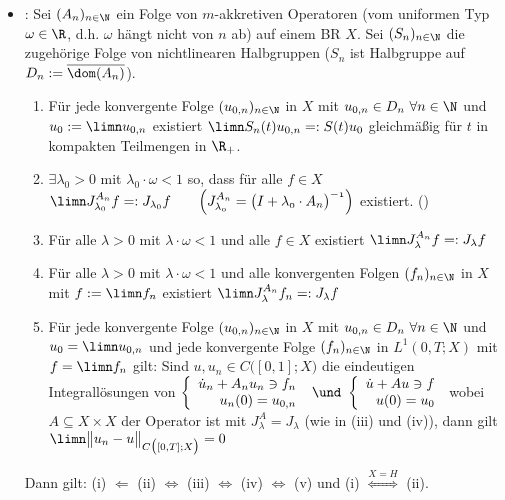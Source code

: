 	\begin{itemize}
		\item {}:
		Sei $(A_n)_{n\in\N}$ ein Folge von $m$-akkretiven Operatoren (vom uniformen Typ $\omega\in\R$, d.h. $\omega$ hängt nicht von $n$ ab) auf einem BR $X$.
	Sei $(S_n)_{n\in\N}$ die zugehörige Folge von nichtlinearen Halbgruppen ($S_n$ ist Halbgruppe auf $D_n:=\overline{\dom(A_n)}$). 
	\begin{enumerate}[label=(\roman*)]
		\item Für jede konvergente Folge $(u_{0,n})_{n\in\N}$ in $X$ mit $u_{0,n}\in D_n~\forall n\in\N$ und $u_0:=\limn u_{0,n}$ existiert
		$
			\limn S_n(t) u_{0,n}=:S(t) u_0
		$
		gleichmäßig für $t$ in kompakten Teilmengen in $\R_+$.
		\item $\exists\lambda_0>0$ mit $\lambda_0\cdot\omega<1$ so, dass für alle $f\in X$
		$
			\limn J_{\lambda_0}^{A_n} f=:J_{\lambda_0}f\qquad \Big(\mit J_{\lambda_0}^{A_n}=\big(I+\lambda_0\cdot A_n\big)^{-1}\Big)
		$
		existiert. ()
		\item Für alle $\lambda>0$ mit $\lambda\cdot\omega<1$ und alle $f\in X$ existiert
		$
			\limn J_\lambda^{A_n} f=:J_\lambda f
		$
		\item Für alle $\lambda>0$ mit $\lambda\cdot\omega<1$ und alle konvergenten Folgen $(f_n)_{n\in\N}$ in $X$ mit $f:=\limn f_n$ existiert
		$
			\limn J_\lambda^{A_n}f_n=:J_\lambda f
		$
		\item Für jede konvergente Folge $(u_{0,n})_{n\in\N}$ in $X$ mit $u_{0,n}\in D_n~\forall n\in\N$ und $u_0=\limn u_{0,n}$ und jede konvergente Folge $(f_n)_{n\in\N}$ in $L^1(0,T;X)$ mit $f=\limn f_n$ gilt:
		Sind $u,u_n\in C\big([0,1];X\big)$ die eindeutigen Integrallösungen von
		$
			\left\lbrace\begin{array}{r}
				\dot{u}_n+A_n u_n\ni f_n\\
				u_n(0)=u_{0,n}
			\end{array}\right.~\und~
			\left\lbrace\begin{array}{r}
				\dot{u}+A u\ni f\\
				u(0)=u_{0}
			\end{array}\right.
		$
		wobei $A\subseteq X\times X$ der Operator ist mit $J_\lambda^A=J_\lambda$ (wie in (iii) und (iv)), dann gilt
		$
			\limn\big\Vert u_n-u\big\Vert_{C\big([0,T];X\big)}=0
		$
	\end{enumerate}
	Dann gilt: (i) $\Longleftarrow$ (ii) $\Longleftrightarrow$ (iii) $\Longleftrightarrow$ (iv) $\Longleftrightarrow$ (v) und (i) $\overset{X=H}{\Longleftrightarrow}$ (ii).

\end{itemize}
